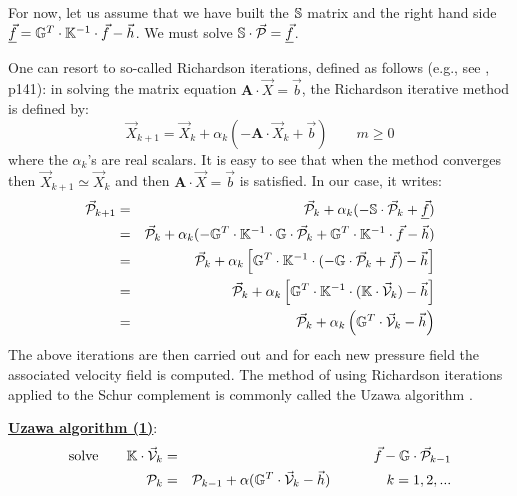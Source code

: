 For now, let us assume that we have built the ${\mathbb{S}}$ matrix and the right hand 
side $\underline{\vec{f}}={\mathbb{G}}^T \cdot {\mathbb{K}}^{-1} \cdot \vec{f} - \vec{h}$.
We must solve ${\mathbb{S}}\cdot \vec{\cal P} = \underline{\vec{f}}$.

One can resort to so-called Richardson iterations, defined as follows (e.g., see \cite{varga}, p141):
in solving the matrix equation ${\bm A}\cdot {\vec X}={\vec b}$,
the Richardson iterative method is defined by: 
\begin{equation}
{\vec X}_{k+1} = {\vec X}_k + \alpha_k (-{\bm A} \cdot {\vec X}_k + {\vec b})
\quad\quad
m\geq 0 
\end{equation}
where the $\alpha_k$'s are real scalars. 
It is easy to see that when the method converges then ${\vec X}_{k+1} \simeq {\vec X}_k$  and then 
${\bm A}\cdot {\vec X}={\vec b}$ is satisfied. 
In our case, it writes:
\begin{eqnarray}
\vec {\cal P}_{k+1} 
&=& \vec {\cal P}_k + \alpha_k ( - {\mathbb{S}} \cdot \vec{\cal P}_k  +  \underline{\vec{f}}) \nonumber\\
&=& \vec {\cal P}_k + \alpha_k ( - {\mathbb{G}}^T \cdot {\mathbb{K}}^{-1} \cdot {\mathbb{G}} \cdot \vec{\cal P}_k  
+  {\mathbb{G}}^T \cdot {\mathbb{K}}^{-1} \cdot \vec{f} - \vec{h}   ) \nonumber\\
&=& \vec {\cal P}_k + \alpha_k \left[ {\mathbb{G}}^T \cdot {\mathbb{K}}^{-1} \cdot ( - {\mathbb{G}} \cdot \vec{\cal P}_k + \vec{f}) - \vec{h} \right] \nonumber\\
&=& \vec {\cal P}_k + \alpha_k \left[ {\mathbb{G}}^T \cdot {\mathbb{K}}^{-1} \cdot ( {\mathbb{K}}\cdot \vec{\cal V}_k)  - \vec{h} \right] \nonumber\\
&=& \vec {\cal P}_k + \alpha_k \left( {\mathbb{G}}^T \cdot \vec{\cal V}_k  - \vec{h} \right) 
\end{eqnarray}
The above iterations are then carried out and for each new pressure field the associated velocity field 
is computed. The method of using Richardson iterations applied to the Schur complement 
is commonly called the Uzawa algorithm \cite[p221]{braess}.

\begin{mdframed}[backgroundcolor=blue!5]
\underline{\bf Uzawa algorithm (1)}:
\begin{eqnarray}
\text{solve} \qquad \mathbb{K} \cdot \vec{\cal V}_k &=& \vec f - \mathbb{G}\cdot \vec {\cal P}_{k-1} \\
{\cal P}_k &=& {\cal P}_{k-1}  + \alpha (\mathbb{G}^T\cdot \vec{\cal V}_k -\vec h)
\quad
\quad
\quad
\quad
k=1,2, ... \label{uzaa2}
\end{eqnarray}
\end{mdframed}


